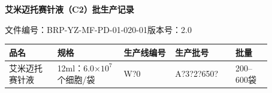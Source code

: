 \documentclass[UTF8,10pt,a4paper,fontset=fandol]{ctexart}
\newcommand{\fieldvalue}[1]{#1}
\newcommand{\handwritten}[1]{#1}
\begin{document}
\newpage

\begin{center}
\textbf{艾米迈托赛针液（C2）批生产记录}
\end{center}

文件编号：BRP-YZ-MF-PD-01-020-01\qquad 版本号：2.0

\begin{tabular}{|p{0.16\linewidth}|p{0.22\linewidth}|p{0.17\linewidth}|p{0.20\linewidth}|p{0.12\linewidth}|}
\hline
品名 & 规格 & 生产线编号 & 生产批号 & 批量 \\
\hline
艾米迈托赛针液 &
12ml：6.0$\times 10^{7}$个细胞/袋 &
\fieldvalue{\handwritten{W?0}} &
\fieldvalue{\handwritten{A?3?2?650?}} &
200--600袋 \\
\hline
\end{tabular}

\vspace{2mm}
\end{document}
